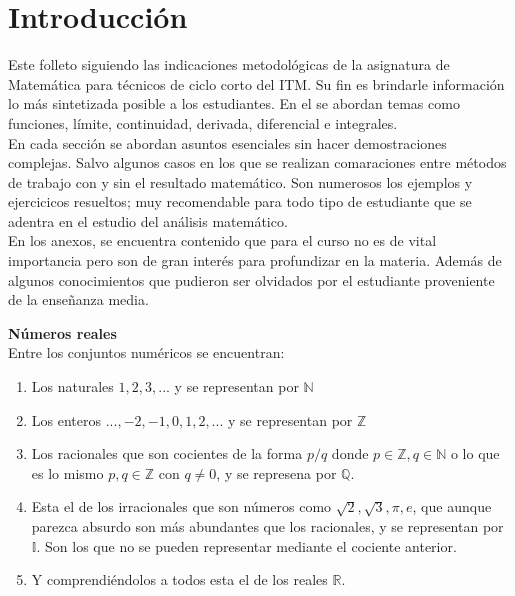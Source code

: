 \documentclass[10pt,twoside]{SelfArx} %
\begin{document}


\section*{Introducci\'on}
Este folleto siguiendo las indicaciones metodológicas de la asignatura de Matemática para técnicos de ciclo corto del ITM. Su fin es brindarle información lo más sintetizada posible a los estudiantes. En el se abordan temas como funciones, límite, continuidad, derivada, diferencial e integrales.\\
En cada sección se abordan asuntos esenciales sin hacer demostraciones complejas. Salvo algunos casos en los que se realizan comaraciones entre métodos de trabajo con y sin el resultado matemático. Son numerosos los ejemplos y ejercicicos resueltos; muy recomendable para todo tipo de estudiante que se adentra en el estudio del análisis matemático.\\
En los anexos, se encuentra contenido que para el curso no es de vital importancia pero son de gran interés para profundizar en la materia. Además de algunos conocimientos que pudieron ser olvidados por el estudiante proveniente de la enseñanza media.


\textbf{Números reales}\\
Entre los conjuntos numéricos se encuentran:
\begin{enumerate}
	\item Los naturales $ 1,2,3,... $ y se representan por $ \mathbb{N} $
	\item Los enteros $ ...,-2,-1,0,1,2,... $ y se representan por $ \mathbb{Z} $
	\item Los racionales que son cocientes de la forma $ p/q $ donde $ p\in\mathbb{Z}, q\in\mathbb{N} $ o lo que es lo mismo
	$ p,q\in \mathbb{Z} $ con $ q\neq0 $, y se represena por $ \mathbb{Q} $.
	\item Esta el de los irracionales que son números como $ \sqrt{2},\sqrt{3},\pi, e $, que aunque parezca absurdo son m\'as  abundantes que los racionales, y se representan por $ \mathbb{I} $. Son los que no se pueden representar mediante el cociente anterior.
	\item Y comprendiéndolos  a todos esta el de los reales $ \mathbb{R} $.
	
\end{enumerate}	
\end{document}
